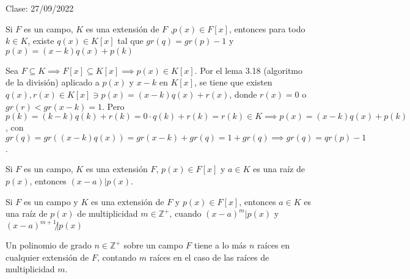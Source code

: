 Clase: 27/09/2022

\begin{lema}
    Si $F$ es un campo, $K$ es una extensión de $F$ ,$p(x)\in F[x]$, entonces para todo $k\in K$, existe $q(x)\in K[x]$ tal que $gr(q)=gr(p)-1$ y $p(x)=(x-k)q(x)+p(k)$
    \begin{dem}
        Sea $F\subseteq K\implies F[x]\subseteq K[x]\implies p(x)\in K[x]$. Por el lema 3.18 (algoritmo de la división) aplicado a $p(x)$ y $x-k$ en $K[x]$, se tiene que existen $q(x),r(x)\in K[x]\ni p(x)=(x-k)q(x)+r(x)$, donde $r(x)=0$ o $gr(r)<gr(x-k)=1$. Pero $p(k)=(k-k)q(k)+r(k)=0\cdot q(k)+r(k)=r(k)\in K\implies p(x)=(x-k)q(x)+p(k)$, con $gr(q)=gr((x-k)q(x))=gr(x-k)+gr(q)=1+gr(q)\implies gr(q)=qr(p)-1$.
    \end{dem}
\end{lema}

\begin{corolario}
    Si $F$ es un campo, $K$ es una extensión $F$, $p(x)\in F[x]$ y $a\in K$ es una raíz de $p(x)$, entonces $(x-a)|p(x)$.
\end{corolario}

\begin{definicion}
    Si $F$ es un campo y $K$ es una extensión de $F$ y $p(x)\in F[x]$, entonces $a\in K$ es una raíz de $p(x)$ de multiplicidad $m\in\mathbb{Z}^+$, cuando $(x-a)^m|p(x)$ y $(x-a)^{m+1}\not| p(x)$
\end{definicion}

\begin{lema}
    Un polinomio de grado $n\in\mathbb{Z}^+$ sobre un campo $F$ tiene a lo más $n$ raíces en cualquier extensión de $F$, contando $m$ raíces en el caso de las raíces de multiplicidad $m$.
\end{lema}

